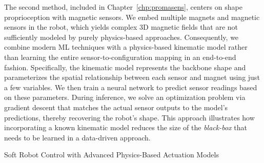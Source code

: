 The second method, included in Chapter~\ref{chp:promasens}, centers on shape proprioception with magnetic sensors. We embed multiple magnets and magnetic sensors in the robot, which yields complex 3D magnetic fields that are not sufficiently modeled by purely physics-based approaches. Consequently, we combine modern \gls{ML} techniques with a physics-based kinematic model rather than learning the entire sensor-to-configuration mapping in an end-to-end fashion. Specifically, the kinematic model represents the backbone shape and parameterizes the spatial relationship between each sensor and magnet using just a few variables. We then train a neural network to predict sensor readings based on these parameters. During inference, we solve an optimization problem via gradient descent that matches the actual sensor outputs to the model’s predictions, thereby recovering the robot’s shape. This approach illustrates how incorporating a known kinematic model reduces the size of the \emph{black-box} that needs to be learned in a data-driven approach.


\begin{contribution}\label{contrib:actuation_models}
    Soft Robot Control with Advanced Physics-Based Actuation Models
\end{contribution}

